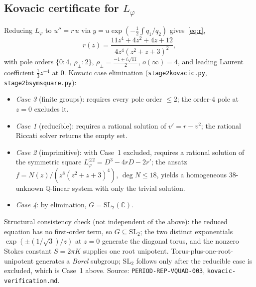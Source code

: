 \documentclass[11pt,reqno]{amsart}
\renewcommand{\_}{\vquadorigunderscore\allowbreak}
\theoremstyle{plain}
\theoremstyle{definition}
\newcommand{\Lphi}{L_{\varphi}}
\newcommand{\SL}{\mathrm{SL}}
\begin{document}
\subsection{Kovacic certificate for \texorpdfstring{$\Lphi$}{Lphi}}\label{app:kovacic}
Reducing $\Lphi$ to $u''=r\,u$ via $y=u\exp(-\tfrac12\int q_1/q_2)$ gives~\eqref{eq:r},
\[
  r(z)=\frac{11z^4+4z^2+4z+12}{4z^4(z^2+z+3)^2},
\]
with pole orders $\{0:4,\ \rho_\pm:2\}$, $\rho_\pm=\tfrac{-1\pm i\sqrt{11}}2$, $o(\infty)=4$, and
leading Laurent coefficient $\tfrac13 z^{-4}$ at $0$. Kovacic case elimination
(\texttt{stage2\_kovacic.py}, \texttt{stage2b\_symsquare.py}):
\begin{itemize}[leftmargin=1.4em,itemsep=1pt]
  \item \emph{Case 3} (finite groups): requires every pole order $\le2$; the order-$4$ pole at
        $z=0$ excludes it.
  \item \emph{Case 1} (reducible): requires a rational solution of $v'=r-v^2$; the rational
        Riccati solver returns the empty set.
  \item \emph{Case 2} (imprimitive): with Case~1 excluded, requires a rational solution of the
        symmetric square $\Lphi^{\odot2}=D^3-4rD-2r'$; the ansatz $f=N(z)/(z^8(z^2+z+3)^4)$,
        $\deg N\le18$, yields a homogeneous $38$-unknown $\mathbb{Q}$-linear system with only the
        trivial solution.
  \item \emph{Case 4}: by elimination, $G=\SL_2(\mathbb{C})$.
\end{itemize}
Structural consistency check (not independent of the above): the reduced equation has no
first-order term, so $G\subseteq\SL_2$; the two distinct exponentials $\exp(\pm(1/\sqrt3)/z)$ at
$z=0$ generate the diagonal torus, and the nonzero Stokes constant $S=2\pi K$ supplies one root
unipotent. Torus-plus-one-root-unipotent generates a \emph{Borel} subgroup; $\SL_2$ follows only
after the reducible case is excluded, which is Case~1 above. Source:
\texttt{PERIOD-REP-VQUAD-003},
\texttt{kovacic-verification.md}.
\end{document}
